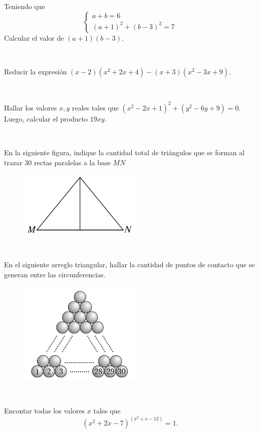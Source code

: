 \begin{exercise}
    Teniendo que
    \[
        \begin{cases}
            a + b = 6\\
            (a + 1)^2 + (b - 3)^2 = 7
        \end{cases}
    \]
    Calcular el valor de $(a + 1)(b - 3)$.
\end{exercise}
\\
\vspace{4cm}

\begin{exercise}
    Reducir la expresión $(x - 2)(x^2 + 2x + 4) - (x + 3)(x^2 - 3x + 9)$.
\end{exercise}
\\
\vspace{4cm}

\begin{exercise}
    Hallar los valores $x,y$ reales tales que $(x^2 - 2x + 1)^2 + (y^2 - 6y + 9) = 0$.
    Luego, calcular el producto $19xy$.
\end{exercise}
\\
\vspace{4cm}

\begin{exercise}
    En la siguiente figura, indique la cantidad total de triángulos que se forman al trazar 30 rectas paralelas a la base $\overline{MN}$
    \begin{figure}[H]
        \centering
        \includegraphics[width=6cm]{image/i1}
    \end{figure}
\end{exercise}
\\
\vspace{4cm}

\begin{exercise}
    En el siguiente arreglo triangular, hallar la cantidad de puntos de contacto que se generan entre las circunferencias.
    \begin{figure}[H]
        \centering
        \includegraphics[width=6cm]{image/i2}
    \end{figure}
\end{exercise}
\\
\vspace{4cm}

\begin{exercise}
    Encontar todas los valores $x$ tales que
    \[
        (x^2 + 2x - 7)^{(x^2 + x - 12)} = 1.
    \]
\end{exercise}